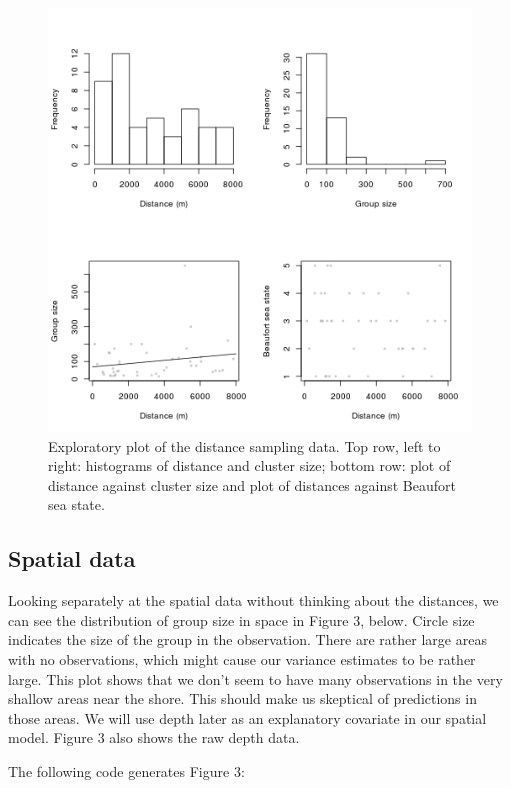 \documentclass[]{amsart}
\makeatletter
\def\maxwidth{\ifdim\Gin@nat@width>\linewidth\linewidth
\else\Gin@nat@width\fi}
\let\Oldincludegraphics\includegraphics
\renewcommand{\includegraphics}[1]{\Oldincludegraphics[width=\maxwidth]{#1}}
\makeatother
\begin{document}
\begin{figure}[htbp]
\centering
\includegraphics{mexico-figs/EDA-plots.png}
\caption{Exploratory plot of the distance sampling data. Top row, left
to right: histograms of distance and cluster size; bottom row: plot of
distance against cluster size and plot of distances against Beaufort sea
state.}
\end{figure}

\subsection{Spatial data}

Looking separately at the spatial data without thinking about the
distances, we can see the distribution of group size in space in Figure
3, below. Circle size indicates the size of the group in the
observation. There are rather large areas with no observations, which
might cause our variance estimates to be rather large. This plot shows
that we don't seem to have many observations in the very shallow areas
near the shore. This should make us skeptical of predictions in those
areas. We will use depth later as an explanatory covariate in our
spatial model. Figure 3 also shows the raw depth data.

The following code generates Figure 3:
\end{document}
